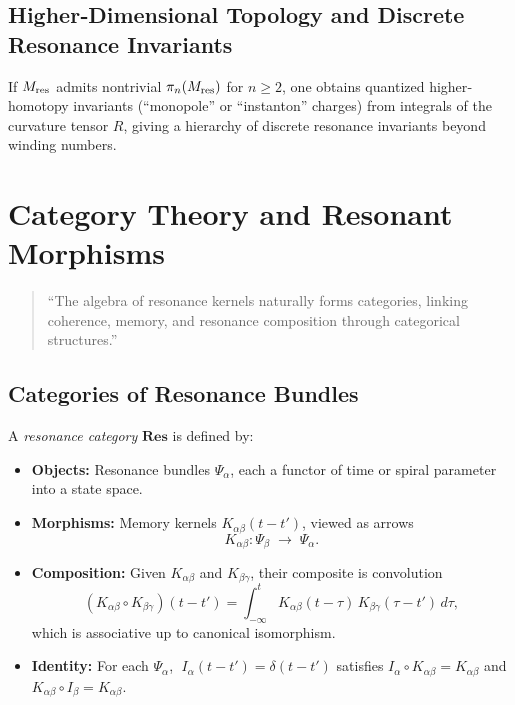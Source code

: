 \subsection{Higher‐Dimensional Topology and Discrete Resonance Invariants}
If \(M_{\rm res}\) admits nontrivial \(\pi_{n}(M_{\rm res})\) for \(n\ge2\), one obtains quantized higher‐homotopy invariants (“monopole” or “instanton” charges) from integrals of the curvature tensor \(R\), giving a hierarchy of discrete resonance invariants beyond winding numbers.

\section{Category Theory and Resonant Morphisms}

\begin{quote}
“The algebra of resonance kernels naturally forms categories, linking coherence, memory, and resonance composition through categorical structures.”
\end{quote}

\subsection{Categories of Resonance Bundles}

A \emph{resonance category} \(\mathbf{Res}\) is defined by:

\begin{itemize}
  \item \textbf{Objects:} Resonance bundles \(\Psi_{\alpha}\), each a functor of time or spiral parameter into a state space.
  \item \textbf{Morphisms:} Memory kernels \(K_{\alpha\beta}(t-t')\), viewed as arrows
    \[
      K_{\alpha\beta}\colon \Psi_{\beta}\;\longrightarrow\;\Psi_{\alpha}.
    \]
  \item \textbf{Composition:} Given \(K_{\alpha\beta}\) and \(K_{\beta\gamma}\), their composite is convolution
    \[
      (K_{\alpha\beta}\circ K_{\beta\gamma})(t-t')
      = \int_{-\infty}^{t}
          K_{\alpha\beta}(t-\tau)\,
          K_{\beta\gamma}(\tau-t')\,
        d\tau,
    \]
    which is associative up to canonical isomorphism.
  \item \textbf{Identity:} For each \(\Psi_{\alpha}\),
    \(\;I_{\alpha}(t-t')=\delta(t-t')\)
    satisfies \(I_{\alpha}\circ K_{\alpha\beta}=K_{\alpha\beta}\) and
    \(K_{\alpha\beta}\circ I_{\beta}=K_{\alpha\beta}.\)
\end{itemize}

